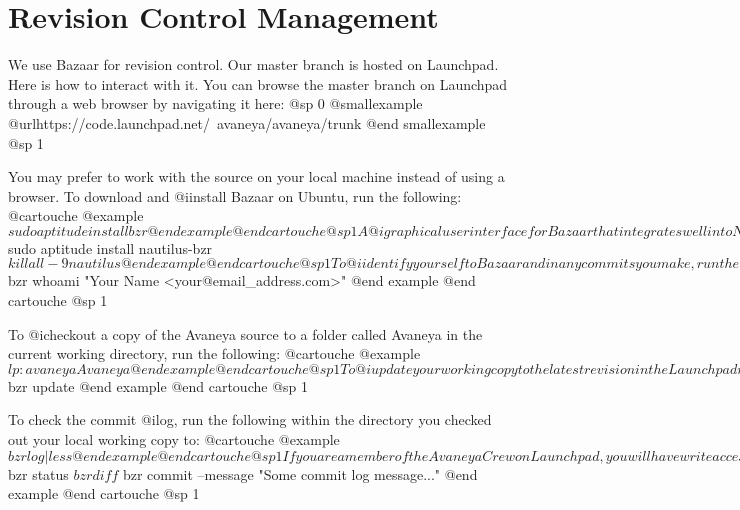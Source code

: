 \section{Revision Control Management}
We use Bazaar for revision control. Our master branch is hosted on Launchpad. Here is how to interact with it. You can browse the master branch on Launchpad through a web browser by navigating it here:
@sp 0
@smallexample
@url{https://code.launchpad.net/~avaneya/avaneya/trunk}
@end smallexample
@sp 1

You may prefer to work with the source on your local machine instead of using a browser. To download and @i{install} Bazaar on Ubuntu, run the following:
@cartouche
@example
$ sudo aptitude install bzr 
@end example
@end cartouche
@sp 1

A @i{graphical user interface} for Bazaar that integrates well into Nautilus is available on Ubuntu. If you would like to use it, run the following command to download, install, and restart Nautilus to make it available:
@cartouche
@example
$ sudo aptitude install nautilus-bzr
$ killall -9 nautilus
@end example
@end cartouche
@sp 1

To @i{identify} yourself to Bazaar and in any commits you make, run the following:
@cartouche
@example
$ bzr whoami "Your Name <your@email_address.com>"
@end example
@end cartouche
@sp 1

To @i{checkout} a copy of the Avaneya source to a folder called Avaneya in the current working directory, run the following:
@cartouche
@example
$ lp:avaneya Avaneya
@end example
@end cartouche
@sp 1

To @i{update} your working copy to the latest revision in the Launchpad master branch, run the following within the directory you checked out your local working copy to:
@cartouche
@example
$ bzr update
@end example
@end cartouche
@sp 1

To check the commit @i{log}, run the following within the directory you checked out your local working copy to:
@cartouche
@example
$ bzr log | less
@end example
@end cartouche
@sp 1

If you are a member of the Avaneya Crew on Launchpad, you will have write access to the repository which is necessary to commit to the master branch. After making your changes, run the following within the directory you checked out your local working copy to see what files you have changed (@i{status}), what changed inside of them (@i{diff}), and to finally upload (@i{commit}) your changes to the master branch:
@cartouche
@example
$ bzr status
$ bzr diff
$ bzr commit --message "Some commit log message..."
@end example
@end cartouche
@sp 1

